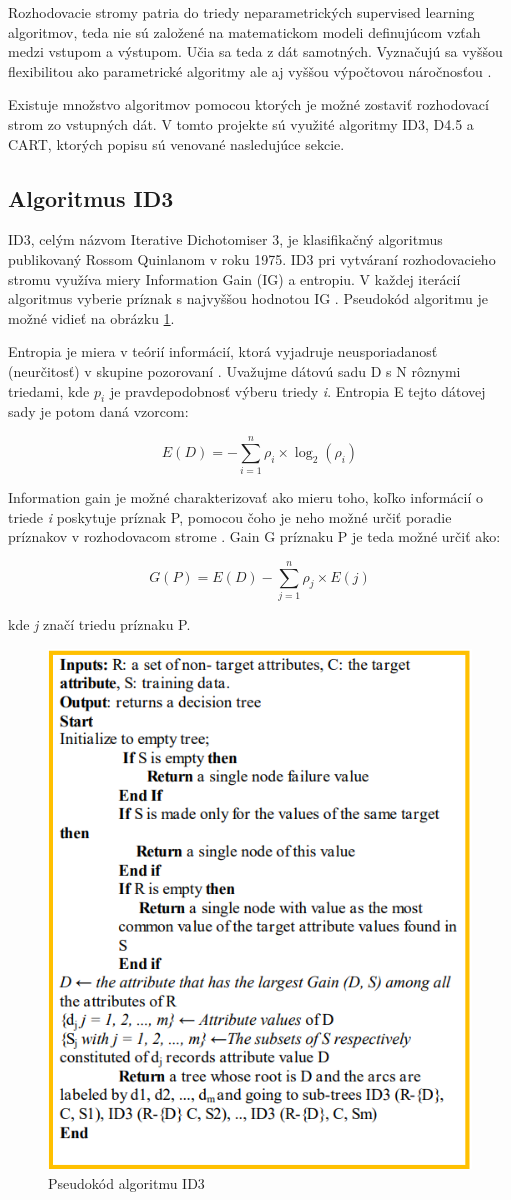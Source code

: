 \documentclass[slovak, master]{diploma}
\begin{document}
Rozhodovacie stromy patria do triedy neparametrických supervised learning algoritmov, teda nie sú založené na matematickom modeli definujúcom vzťah medzi vstupom a výstupom. Učia sa teda z dát samotných. Vyznačujú sa vyššou flexibilitou ako parametrické algoritmy ale aj vyššou výpočtovou náročnosťou \cite{paramVSnonparam}. 

Existuje množstvo algoritmov pomocou ktorých je možné zostaviť rozhodovací strom zo vstupných dát. V tomto projekte sú využité algoritmy ID3, D4.5 a CART, ktorých popisu sú venované nasledujúce sekcie. 

\subsection{Algoritmus ID3}
\label{sec:ID3}
ID3, celým názvom Iterative Dichotomiser 3, je klasifikačný algoritmus publikovaný Rossom Quinlanom v roku 1975. ID3 pri vytváraní rozhodovacieho stromu využíva miery Information Gain (IG) a entropiu. V každej iterácií algoritmus vyberie príznak s najvyššou hodnotou IG \cite{hssina2014comparative}. Pseudokód algoritmu je možné vidieť na obrázku \ref{pic:id3Pseudo}.

Entropia je miera v teórií informácií, ktorá vyjadruje neusporiadanosť (neurčitosť) v skupine pozorovaní \cite{EntropyAndGain}. Uvažujme dátovú sadu D s N rôznymi triedami, kde \textit{$p_i$} je pravdepodobnosť výberu triedy \textit{i}. Entropia E tejto dátovej sady je potom daná vzorcom: 

\[E(D) = -\displaystyle\sum\limits_{i=1}^n \rho_i \times \log_2(\rho_i)\]

Information gain je možné charakterizovať ako mieru toho, koľko informácií o triede \textit{i} poskytuje príznak P, pomocou čoho je neho možné určiť poradie príznakov v rozhodovacom strome \cite{EntropyAndGain}. Gain G príznaku P je teda možné určiť ako:

\[G(P) = E(D) - \displaystyle\sum\limits_{j=1}^n \rho_j \times E(j)\]

kde \textit{j} značí triedu príznaku P.
\\
\begin{figure}[!htb]
    \centering
    \includegraphics[width=.55\textwidth]{Figures/id3Pseudo.png}
    \caption{Pseudokód algoritmu ID3 \cite{hssina2014comparative}}
    \label{pic:id3Pseudo}
\end{figure}
\end{document}
